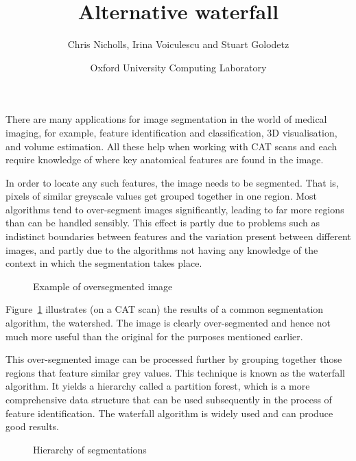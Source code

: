 \documentclass[a4paper]{article}
\title{\LARGE \bf
Alternative waterfall
}
\author{Chris Nicholls, Irina Voiculescu and Stuart Golodetz
}
\date{Oxford University Computing Laboratory}
\begin{document}
\maketitle
\thispagestyle{empty}
\pagestyle{plain}



There are many applications for image segmentation in the world of
medical imaging, for example, feature identification and
classification, 3D visualisation, and volume estimation. All these
help when working with CAT scans and each require knowledge of where
key anatomical features are found in the image.

In order to locate any such features, the image needs to be
segmented. That is, pixels of similar greyscale values get grouped
together in one region. Most algorithms tend to over-segment images
significantly, leading to far more regions than can be handled
sensibly. This effect is partly due to problems such as indistinct
boundaries between features and the variation present between
different images, and partly due to the algorithms not having any
knowledge of the context in which the segmentation takes place.

\begin{figure}
\centering
\ifpdf
        {}%
\else
\fi
\caption{Example of oversegmented image}
\label{fig:oversegmented}
\end{figure}

Figure~\ref{fig:oversegmented} illustrates (on a CAT scan) the results
of a common segmentation algorithm, the watershed. The image is
clearly over-segmented and hence not much more useful than the
original for the purposes mentioned earlier.

This over-segmented image can be processed further by grouping
together those regions that feature similar grey values. This
technique is known as the waterfall algorithm. It yields a hierarchy
called a partition forest, which is a more comprehensive data
structure that can be used subsequently in the process of feature
identification. The waterfall algorithm is widely used and can produce
good results.

\begin{figure}
\centering
\ifpdf
        {}%
\else
\fi
\caption{Hierarchy of segmentations}
\label{fig:waterfall}
\end{figure}
\end{document}
